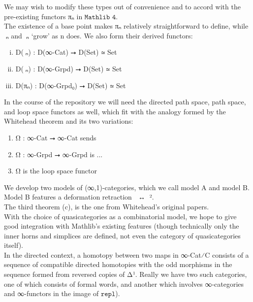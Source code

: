 \documentclass{book}
\theoremstyle{definition}
\begin{document}
We may wish to modify these types out of convenience and to accord with the pre-existing functors πₙ in $\texttt{Mathlib 4}$.\\

The existence of a base point makes πₙ relatively straightforward to define, while π⃗ₙ and π⃡ₙ `grow' as n does. We also form their derived functors:

\begin{enumerate}[(i)]
\item D(π⃗ₙ) : D(∞-Cat) ⭢ D(Set) ≃ Set
\item D(π⃡ₙ) : D(∞-Grpd) ⭢ D(Set) ≃ Set
\item D(πₙ) : D(∞-Grpd₀) ⭢ D(Set) ≃ Set
\end{enumerate}

In the course of the repository we will need the directed path space, path space, and loop space functors as well, which fit with the analogy formed by the Whitehead theorem and its two variations:

\begin{enumerate}
\item Ω⃗ : ∞-Cat ⭢ ∞-Cat sends 
\item Ω⃡ : ∞-Grpd ⭢ ∞-Grpd is ...
\item Ω is the loop space functor
\end{enumerate}

We develop two models of (∞,1)-categories, which we call model A⃗ and model B⃗. Model B⃗ features a deformation retraction γ⃗ ↔ γ⃗².\\

The third theorem (c), is the one from Whitehead's original papers.\\

With the choice of quasicategories as a combinatorial model, we hope to give good integration with Mathlib's existing features (though technically only the inner horns and simplices are defined, not even the category of quasicategories itself).\\

In the directed context, a homotopy between two maps in ∞-Cat⁄C consists of a sequence of compatible directed homotopies with the odd morphisms in the sequence formed from reversed copies of Δ¹. Really we have two such categories, one of which consists of formal words, and another which involves ∞-categories and ∞-functors in the image of $\texttt{repl}$).\\
\end{document}
